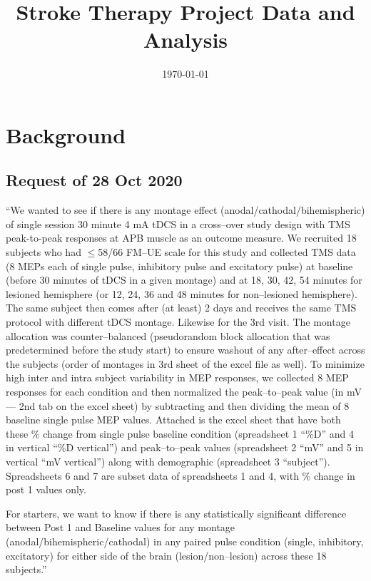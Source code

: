 \documentclass[11pt]{article}\usepackage[]{graphicx}\usepackage[]{color}
\begin{document}

\title{Stroke Therapy Project Data and Analysis}
\author{ }
\date{\today}
\maketitle

\section{Background}

\subsection{Request of 28 Oct 2020}

``We wanted to see if there is any montage effect
(anodal/cathodal/bihemispheric) of single session 30 minute 4 mA tDCS
in a cross--over study design with TMS peak-to-peak responses at APB
muscle as an outcome measure. We recruited 18 subjects who had
$\le$58/66 FM--UE scale for this study and collected TMS data (8 MEPs
each of single pulse, inhibitory pulse and excitatory pulse) at
baseline (before 30 minutes of tDCS in a given montage) and at 18, 30,
42, 54 minutes for lesioned hemisphere (or 12, 24, 36 and 48 minutes
for non--lesioned hemisphere). The same subject then comes after (at
least) 2 days and receives the same TMS protocol with different tDCS
montage. Likewise for the 3rd visit. The montage allocation was
counter--balanced (pseudorandom block allocation that was
predetermined before the study start) to ensure washout of any
after--effect across the subjects (order of montages in 3rd sheet of
the excel file as well). To minimize high inter and intra subject
variability in MEP responses, we collected 8 MEP responses for each
condition and then normalized the peak--to--peak value (in mV --- 2nd
tab on the excel sheet) by subtracting and then dividing the mean of 8
baseline single pulse MEP values. Attached is the excel sheet that
have both these \% change from single pulse baseline condition
(spreadsheet 1 ``\%D'' and 4 in vertical ``\%D vertical'') and
peak--to--peak values (spreadsheet 2 ``mV'' and 5 in vertical ``mV
vertical'') along with demographic (spreadsheet 3
``subject''). Spreadsheets 6 and 7 are subset data of spreadsheets 1
and 4, with \% change in post 1 values only.

For starters, we want to know if there is any statistically
significant difference between Post 1 and Baseline values for any
montage (anodal/bihemispheric/cathodal) in any paired pulse condition
(single, inhibitory, excitatory) for either side of the brain
(lesion/non--lesion) across these 18 subjects.''
 
\end{document}
